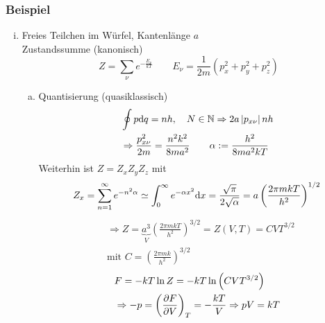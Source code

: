 \subsubsection*{Beispiel}
\begin{enumerate}[i)]
    \item Freies Teilchen im Würfel, Kantenlänge $a$ \\
    Zustandssumme (kanonisch)
    \begin{equation}
        Z = \sum_\nu e^{- \frac{E_\nu}{k T}} \qquad E_\nu = \frac{1}{2 m} \left( p_x^2 + p_y^2 + p_z^2 \right)
    \end{equation}
    \begin{enumerate}[a)]
        \item Quantisierung (quasiklassisch)
        \begin{equation}
            \begin{split}
                & \oint p \mathrm{d} q = n h, \quad N \in \mathbb{N} \Rightarrow 2 a \left| p_{x \nu}  \right| n h \\
                & \Rightarrow \frac{p_{x \nu}^2}{2 m} = \frac{n^2 k^2}{8 m a^2} \qquad \alpha := \frac{h^2}{8 m a^2 k T}
            \end{split}
        \end{equation}
        Weiterhin ist $Z = Z_x Z_y Z_z$ mit
        \begin{equation}
            Z_x = \sum_{n=1}^{\infty} e^{-n^2 \alpha} \simeq \int_{0}^{\infty} e^{-\alpha x^2} \mathrm{d} x
            = \frac{\sqrt{\pi}}{2 \sqrt{\alpha}} = a \left( \frac{2 \pi m k T}{h^2} \right)^{1/2}
        \end{equation}
        \begin{equation}
            \begin{split}
                & \Rightarrow Z = \underbrace{a^3}_{V} \left( \frac{2 \pi m k T}{h^2} \right)^{3/2} = Z(V, T) = C V T^{3/2} \\
                & \text{mit } C = \left( \frac{2 \pi m k }{h^2} \right)^{3/2}
            \end{split}
        \end{equation}
        \begin{equation}
            \begin{split}
                & F = - k T \ln Z = - k T \ln \left( C V T^{3/2} \right) \\
                & \Rightarrow - p = \pdi{F}{V}{T} = - \frac{k T}{V} \Rightarrow p V = k T
            \end{split}

\end{equation}
\end{enumerate}
\end{enumerate}
